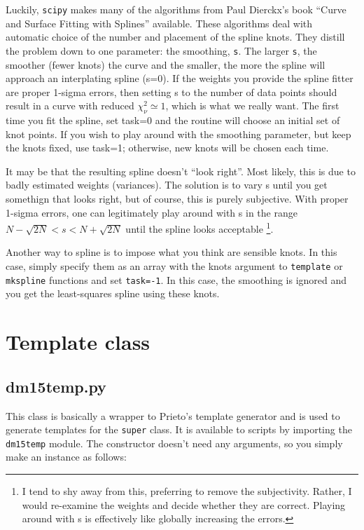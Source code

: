 \documentclass[12pt]{article}
\begin{document}
Luckily, \texttt{scipy} makes many of the algorithms from Paul Dierckx's
book {}``Curve and Surface Fitting with Splines''\cite{Dierckx1993}
available. These algorithms deal with automatic choice of the number
and placement of the spline knots. They distill the problem down to
one parameter: the smoothing, \texttt{s}. The larger \texttt{s}, the
smoother (fewer knots) the curve and the smaller, the more the spline
will approach an interplating spline (s=0). If the weights you provide
the spline fitter are proper 1-sigma errors, then setting s to the
number of data points should result in a curve with reduced $\chi_{\nu}^{2}\simeq1$,
which is what we really want. The first time you fit the spline, set
task=0 and the routine will choose an initial set of knot points.
If you wish to play around with the smoothing parameter, but keep
the knots fixed, use task=1; otherwise, new knots will be chosen each
time.

It may be that the resulting spline doesn't {}``look right''. Most
likely, this is due to badly estimated weights (variances). The solution
is to vary s until you get somethign that looks right, but of course,
this is purely subjective. With proper 1-sigma errors, one can legitimately
play around with s in the range $N-\sqrt{2N}<s<N+\sqrt{2N}$ until
the spline looks acceptable%
\footnote{I tend to shy away from this, preferring to remove the subjectivity.
Rather, I would re-examine the weights and decide whether they are
correct. Playing around with s is effectively like globally increasing
the errors.%
}.

Another way to spline is to impose what you think are sensible knots.
In this case, simply specify them as an array with the knots argument
to \texttt{template} or \texttt{mkspline} functions and set \texttt{task=-1}.
In this case, the smoothing is ignored and you get the least-squares
spline using these knots.


\section{Template class\label{sec:Template-class}}


\subsection{dm15temp.py}

This class is basically a wrapper to Prieto's template generator and
is used to generate templates for the \texttt{super} class. It is
available to scripts by importing the \texttt{dm15temp} module. The
constructor doesn't need any arguments, so you simply make an instance
as follows:
\end{document}

